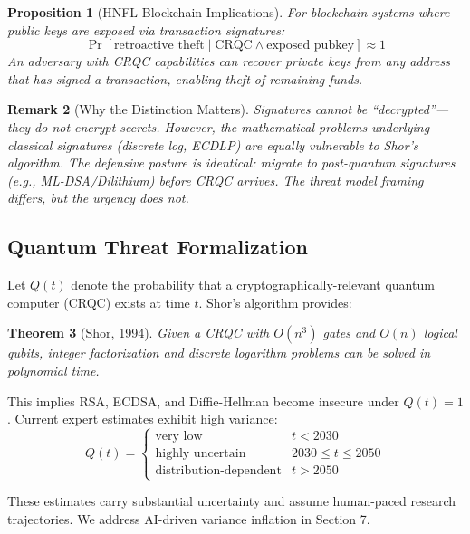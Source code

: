 \documentclass[11pt,a4paper]{article}
\newtheorem{theorem}{Theorem}[section]
\newtheorem{proposition}[theorem]{Proposition}
\newtheorem{remark}[theorem]{Remark}
\begin{document}
\begin{proposition}[HNFL Blockchain Implications]
For blockchain systems where public keys are exposed via transaction signatures:
\begin{equation}
\Pr[\text{retroactive theft} \mid \text{CRQC} \land \text{exposed pubkey}] \approx 1
\end{equation}
An adversary with CRQC capabilities can recover private keys from any address that has signed a transaction, enabling theft of remaining funds.
\end{proposition}

\begin{remark}[Why the Distinction Matters]
Signatures cannot be ``decrypted''---they do not encrypt secrets. However, the \textit{mathematical problems} underlying classical signatures (discrete log, ECDLP) are equally vulnerable to Shor's algorithm. The defensive posture is identical: migrate to post-quantum signatures (e.g., ML-DSA/Dilithium) before CRQC arrives. The threat model framing differs, but the urgency does not.
\end{remark}

\subsection{Quantum Threat Formalization}

Let $Q(t)$ denote the probability that a cryptographically-relevant quantum computer (CRQC) exists at time $t$. Shor's algorithm provides:

\begin{theorem}[Shor, 1994]
Given a CRQC with $O(n^3)$ gates and $O(n)$ logical qubits, integer factorization and discrete logarithm problems can be solved in polynomial time.
\end{theorem}

This implies RSA, ECDSA, and Diffie-Hellman become insecure under $Q(t) = 1$. Current expert estimates exhibit high variance:
\begin{equation}
Q(t) = \begin{cases}
\text{very low} & t < 2030 \\
\text{highly uncertain} & 2030 \leq t \leq 2050 \\
\text{distribution-dependent} & t > 2050
\end{cases}
\end{equation}

These estimates carry substantial uncertainty and assume human-paced research trajectories. We address AI-driven variance inflation in Section 7.
\end{document}
